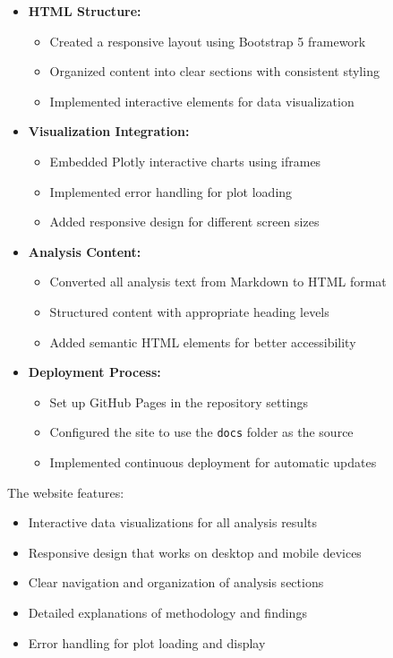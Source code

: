 \documentclass[12pt]{article}
\begin{document}
\begin{itemize}
    \item \textbf{HTML Structure:}
    \begin{itemize}
        \item Created a responsive layout using Bootstrap 5 framework
        \item Organized content into clear sections with consistent styling
        \item Implemented interactive elements for data visualization
    \end{itemize}
    
    \item \textbf{Visualization Integration:}
    \begin{itemize}
        \item Embedded Plotly interactive charts using iframes
        \item Implemented error handling for plot loading
        \item Added responsive design for different screen sizes
    \end{itemize}
    
    \item \textbf{Analysis Content:}
    \begin{itemize}
        \item Converted all analysis text from Markdown to HTML format
        \item Structured content with appropriate heading levels
        \item Added semantic HTML elements for better accessibility
    \end{itemize}
    
    \item \textbf{Deployment Process:}
    \begin{itemize}
        \item Set up GitHub Pages in the repository settings
        \item Configured the site to use the \texttt{docs} folder as the source
        \item Implemented continuous deployment for automatic updates
    \end{itemize}
\end{itemize}

The website features:
\begin{itemize}
    \item Interactive data visualizations for all analysis results
    \item Responsive design that works on desktop and mobile devices
    \item Clear navigation and organization of analysis sections
    \item Detailed explanations of methodology and findings
    \item Error handling for plot loading and display
\end{itemize}
\end{document}

